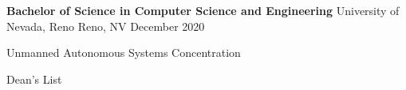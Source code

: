 
\begin{cventries}
  \cventry
    {\textbf{Bachelor of Science in Computer Science and Engineering}} %
    {University of Nevada, Reno} %
    {Reno, NV} %
    {December 2020} %
    {
      \begin{cvitems} %
         \item {Unmanned Autonomous Systems Concentration}
         \item {Dean's List}
      \end{cvitems}
    }
\end{cventries}
